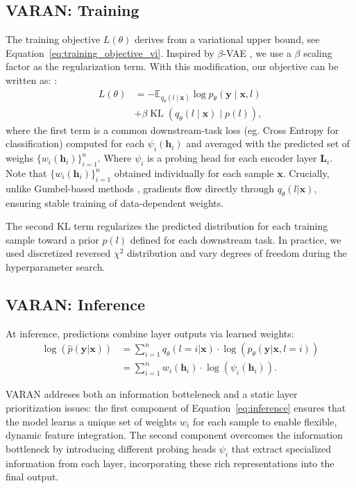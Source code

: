 \subsection{VARAN: Training}
The training objective $L(\theta)$ derives from a variational upper bound, see Equation~\ref{eq:training_objective_vi}. Inspired by $\beta$-VAE \cite{higgins2017betavae}, we use a $\beta$ scaling factor as the regularization term. With this modification, our objective can be written as:
\cite{Kingma2013VAE}:  
\begin{align}
\label{eq:objective}
    L(\theta) &= - \mathbb{E}_{q_\theta(l \mid \boldsymbol{x})} \log p_\theta(\boldsymbol{y}\mid \boldsymbol{x}, l) \nonumber \\
    &+ \beta \operatorname{KL} \left(q_\theta(l\mid \boldsymbol{x}) \mid p(l)\right),
\end{align}
where the first term is a common downstream-task loss (eg. Cross Entropy for classification) computed for each $\psi_i(\boldsymbol{h}_i)$ and averaged with the predicted set of weighs $\{w_i(\boldsymbol{h}_i)\}_{i=1}^n$. 
Where $\psi_i$ is a probing head for each encoder layer $\mathbf{L}_i$.
Note that $\{w_i(\boldsymbol{h}_i)\}_{i=1}^n$ obtained individually for each sample $\boldsymbol{x}$.  Crucially, unlike Gumbel-based methods \cite{jang2016categorical}, gradients flow directly through $q_\theta(l|\boldsymbol{x})$, ensuring stable training of data-dependent weights.  

The second KL term regularizes the predicted distribution for each training sample toward a prior $p(l)$ defined for each downstream task. In practice, we used discretized reversed $\chi^2$ distribution and vary degrees of freedom during the hyperparameter search.

\subsection{VARAN: Inference}
At inference, predictions combine layer outputs via learned weights:  
\begin{align}\label{eq:inference}
    \log(\hat{p}(\boldsymbol{y}|\boldsymbol{x})) &= \sum_{i=1}^{n}q_\theta(l=i|\boldsymbol{x}) \cdot \log(p_\theta(\boldsymbol{y}|\boldsymbol{x}, l=i)) \nonumber \\  
    &= \sum_{i=1}^{n}w_i(\boldsymbol{h}_i) \cdot \log(\psi_i(\boldsymbol{h}_i)).  
\end{align}  


VARAN addreses both an information botteleneck and a static layer prioritization issues: the first component of Equation~\ref{eq:inference} ensures that the model learns a unique set of weights $w_i$ for each sample to enable flexible, dynamic feature integration. The second component overcomes the information bottleneck by introducing different probing heads $\psi_i$ that extract specialized information from each layer, incorporating these rich representations into the final output. 

